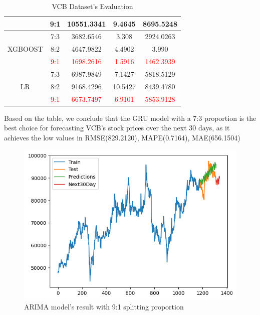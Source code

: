 \documentclass{ieeeojies}
\begin{document}
\begin{table}[H]
\begin{tabular}{|c|c|c|c|c|}
        & 9:1 & 10551.3341 & 9.4645 & 8695.5248 \\ \hline
        \multirow{3}{*}{XGBOOST} & 7:3 & 3682.6546 & 3.308 & 2924.0263 \\
        & 8:2 & 4647.9822 & 4.4902 & 3.990 \\
        & \textcolor{red}{9:1} & \textcolor{red}{1698.2616} & \textcolor{red}{1.5916} & \textcolor{red}{1462.3939} \\ \hline
        \multirow{3}{*}{LR} & 7:3 & 6987.9849 & 7.1427 & 5818.5129 \\
        & 8:2 & 9168.4296 & 10.5427 & 8439.4780 \\
        & \textcolor{red}{9:1} & \textcolor{red}{6673.7497} & \textcolor{red}{6.9101} & \textcolor{red}{5853.9128} \\ \hline
        \end{tabular}
    \caption{VCB Dataset's Evaluation}
    \label{tab:dataset_evaluation}
\end{table}

Based on the table, we conclude that the GRU model with
a 7:3 proportion is the best choice for forecasting VCB’s
stock prices over the next 30 days, as it achieves the low
values in RMSE(829.2120), MAPE(0.7164), MAE(656.1504)

\begin{figure}[H]
  \centering
  \begin{minipage}{0.6\linewidth}
    \centering
    \includegraphics[width=\linewidth]{bibliography/diagram/ARIMA-VCB.png}
    \caption{ARIMA model’s result with 9:1 splitting proportion}
    \label{fig8}
  \end{minipage}
\end{figure}
\end{document}
